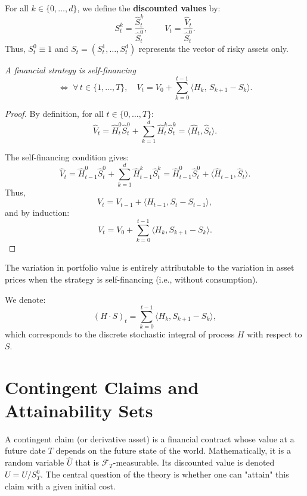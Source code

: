 \begin{definition}
For all $k\in\{0,\ldots,d\}$, we define the \textbf{discounted values} by:
\[
S_t^k = \frac{\hat S_t^k}{\hat S_t^0}, \qquad V_t = \frac{\hat V_t}{\hat S_t^0}.
\]
Thus, $S_t^0 \equiv 1$ and $S_t = (S_t^1,\ldots,S_t^d)$ represents the vector of risky assets only.
\end{definition}

\begin{lemma}

\emph{A financial strategy is self-financing}
\[
\Longleftrightarrow\;
\forall\, t \in \{1,\ldots,T\},\quad
V_t = V_0 + \sum_{k=0}^{t-1} \langle H_k,\, S_{k+1} - S_k \rangle.
\]
\end{lemma}



\begin{proof}
By definition, for all $t\in\{0,\ldots,T\}$:
\[
\hat V_t = \hat H_t^0 \hat S_t^0 + \sum_{k=1}^d \hat H_t^k \hat S_t^k = \langle \hat H_t, \hat S_t \rangle.
\]

The self-financing condition gives:
\[
\hat V_t = \hat H_{t-1}^0 \hat S_t^0 + \sum_{k=1}^d \hat H_{t-1}^k \hat S_t^k = \hat H_{t-1}^0 \hat S_t^0 + \langle \hat H_{t-1}, \hat S_t \rangle.
\]
Thus,
\[
V_t = V_{t-1} + \langle H_{t-1}, S_t - S_{t-1} \rangle,
\]
and by induction:
\[
V_t = V_0 + \sum_{k=0}^{t-1} \langle H_k, S_{k+1} - S_k \rangle.
\]
\end{proof}

\begin{remark}
The variation in portfolio value is entirely attributable to the variation in asset prices when the strategy is self-financing (i.e., without consumption).
\end{remark}

\begin{remark}
We denote:
\[
(H \cdot S)_t = \sum_{k=0}^{t-1} \langle H_k, S_{k+1} - S_k \rangle,
\]
which corresponds to the discrete stochastic integral of process $H$ with respect to $S$.
\end{remark}


\section{Contingent Claims and Attainability Sets}

A contingent claim (or derivative asset) is a financial contract whose value at a future date $T$ depends on the future state of the world. Mathematically, it is a random variable $\hat{U}$ that is $\mathcal{F}_T$-measurable. Its discounted value is denoted $U = \hat{U} / S^0_T$. The central question of the theory is whether one can "attain" this claim with a given initial cost.

